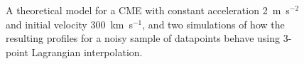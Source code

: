 \documentclass[preprint2]{aastex}
\begin{document}
\begin{figure}[ht]
\caption{A theoretical model for a CME with constant acceleration 2~m~s$^{-2}$ and initial velocity 300~km~s$^{-1}$, and two simulations of how the resulting profiles for a noisy sample of datapoints behave using 3-point Lagrangian interpolation.}
\label{sim_vels_thesis}
\end{figure}
\end{document}
